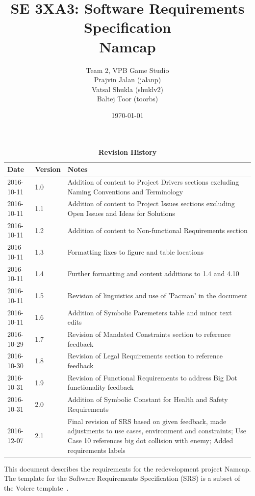 \documentclass[12pt, titlepage]{article}
\title{SE 3XA3: Software Requirements Specification\\Namcap}
\author{Team 2, VPB Game Studio
		\\ Prajvin Jalan (jalanp)
		\\ Vatsal Shukla (shuklv2)
		\\ Baltej Toor (toorbs)
}
\date{\today}
\begin{document}
\maketitle

\tableofcontents
\listoftables
\listoffigures

\newpage

\begin{table}[H]
\caption{\bf Revision History}
\begin{tabularx}{\textwidth}{p{3cm}p{2cm}X}
\toprule {\bf Date} & {\bf Version} & {\bf Notes}\\
\midrule
2016-10-11 & 1.0 & Addition of content to Project Drivers sections excluding Naming Conventions and Terminology\\
2016-10-11 & 1.1 & Addition of content to Project Issues sections excluding Open Issues and Ideas for Solutions\\
2016-10-11 & 1.2 & Addition of content to Non-functional Requirements section\\
2016-10-11 & 1.3 & Formatting fixes to figure and table locations\\
2016-10-11 & 1.4 & Further formatting and content additions to 1.4 and 4.10\\
2016-10-11 & 1.5 & Revision of linguistics and use of 'Pacman' in the document\\
2016-10-11 & 1.6 & Addition of Symbolic Paremeters table and minor text edits\\
2016-10-29 & 1.7 & Revision of Mandated Constraints section to reference feedback\\
2016-10-30 & 1.8 & Revision of Legal Requirements section to reference feedback\\
2016-10-31 & 1.9 & Revision of Functional Requirements to address Big Dot functionality feedback\\
2016-10-31 & 2.0 & Addition of Symbolic Constant for Health and Safety Requirements\\
2016-12-07 & 2.1 & Final revision of SRS based on given feedback, made adjustments to use cases, environment and constraints; Use Case 10 references big dot collision with enemy; Added requirements labels\\
\bottomrule
\end{tabularx}
\end{table}

\newpage


This document describes the requirements for the redevelopment project Namcap.  The template for the Software
Requirements Specification (SRS) is a subset of the Volere
template~\citep{RobertsonAndRobertson2012}.
\end{document}
